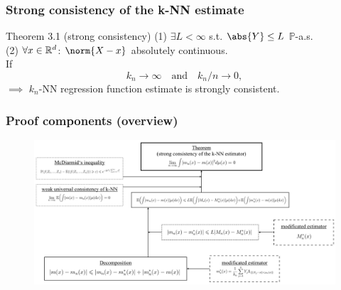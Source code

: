 \begin{frame}
\frametitle{Strong consistency of the k-NN estimate}
\begin{alertblock}{Theorem 3.1 (strong consistency)}
(1) \(\exists L < \infty\) s.t. \(\abs{Y} \leq L\) \(\mathbb{P}\)-a.s. \\
(2) \(\forall x \in \mathbb{R}^d\): \(\norm{X - x}\) absolutely continuous. \\ 
If \[k_n \to \infty \quad \text{and} \quad k_n / n \to 0,\]
\(\implies\) \(k_n\)-NN regression function estimate is strongly consistent. 
\end{alertblock}
\end{frame}

\begin{frame}
\frametitle{Proof components (overview)}
\begin{figure}
    \includegraphics[scale=0.11]{organigramknn.jpeg}
    \centering
\end{figure}
\end{frame}



